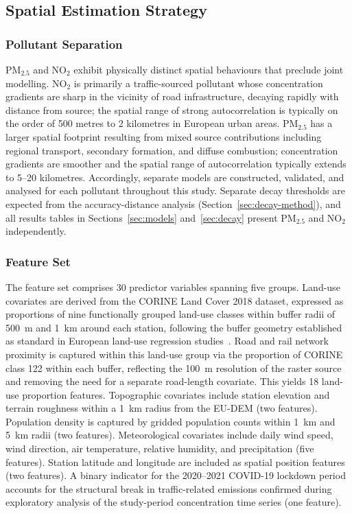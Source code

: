 \documentclass[11pt,a4paper]{article}
\let\oldsubsection\subsection
\renewcommand{\subsection}{\FloatBarrier\oldsubsection}
\begin{document}
\subsection{Spatial Estimation Strategy}
\label{sec:estimation-strategy}

\subsubsection{Pollutant Separation}

PM$_{2.5}$ and NO$_2$ exhibit physically distinct spatial behaviours that preclude joint modelling. NO$_2$ is primarily a traffic-sourced pollutant whose concentration gradients are sharp in the vicinity of road infrastructure, decaying rapidly with distance from source; the spatial range of strong autocorrelation is typically on the order of 500 metres to 2 kilometres in European urban areas. PM$_{2.5}$ has a larger spatial footprint resulting from mixed source contributions including regional transport, secondary formation, and diffuse combustion; concentration gradients are smoother and the spatial range of autocorrelation typically extends to 5--20 kilometres. Accordingly, separate models are constructed, validated, and analysed for each pollutant throughout this study. Separate decay thresholds are expected from the accuracy-distance analysis (Section~\ref{sec:decay-method}), and all results tables in Sections~\ref{sec:models} and~\ref{sec:decay} present PM$_{2.5}$ and NO$_2$ independently.

\subsubsection{Feature Set}

The feature set comprises 30 predictor variables spanning five groups. Land-use covariates are derived from the CORINE Land Cover 2018 dataset, expressed as proportions of nine functionally grouped land-use classes within buffer radii of 500~m and 1~km around each station, following the buffer geometry established as standard in European land-use regression studies~\cite{hoek_lur_review_2008}. Road and rail network proximity is captured within this land-use group via the proportion of CORINE class 122 within each buffer, reflecting the 100~m resolution of the raster source and removing the need for a separate road-length covariate. This yields 18 land-use proportion features. Topographic covariates include station elevation and terrain roughness within a 1~km radius from the EU-DEM (two features). Population density is captured by gridded population counts within 1~km and 5~km radii (two features). Meteorological covariates include daily wind speed, wind direction, air temperature, relative humidity, and precipitation (five features). Station latitude and longitude are included as spatial position features (two features). A binary indicator for the 2020--2021 COVID-19 lockdown period accounts for the structural break in traffic-related emissions confirmed during exploratory analysis of the study-period concentration time series (one feature).
\end{document}
